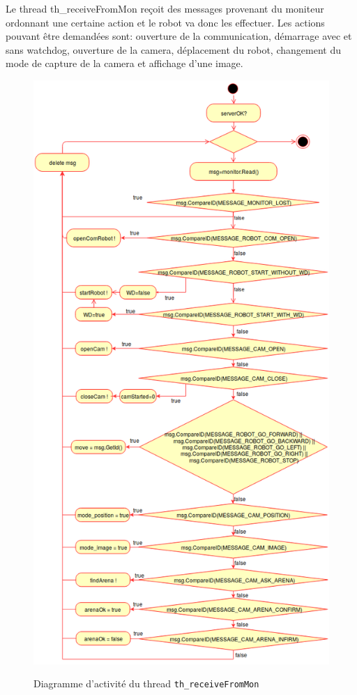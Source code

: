 \documentclass[11pt, a4paper]{paper}
\begin{document}
{ Le thread th\_receiveFromMon reçoit des messages provenant du moniteur ordonnant une certaine action et le robot va donc les effectuer. Les actions pouvant être demandées sont: ouverture de la communication, démarrage avec et sans watchdog, ouverture de la camera, déplacement du robot, changement du mode de capture de la camera et affichage d'une image. }

\begin{figure}[htp]
\label{fig:act_communiquer}
\begin{center}
{\includegraphics[scale=.4]{./dossier_conception/th_receiveFromMon.png}}
{\caption{Diagramme d'activité du thread {\tt th\_receiveFromMon}}}
\end{center}
\end{figure}
\FloatBarrier
\end{document}

